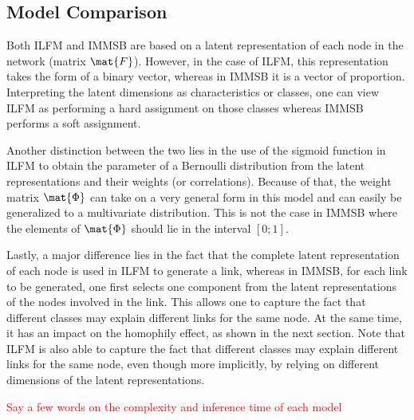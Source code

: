 \subsection{Model Comparison}

Both ILFM and IMMSB are based on a latent representation of each node in the network (matrix $\mat{F}$). However, in the case of ILFM, this representation takes the form of a binary vector, whereas in IMMSB it is a vector of proportion. Interpreting the latent dimensions as characteristics or classes, one can view ILFM as performing a hard assignment on those classes whereas IMMSB performs a soft assignment. 

Another distinction between the two lies in the use of the sigmoid function in ILFM to obtain the parameter of a Bernoulli distribution from the latent representations and their weights (or correlations). Because of that, the weight matrix $\mat{\Phi}$ can take on a very general form in this model and can easily be generalized to a multivariate distribution. This is not the case in IMMSB where the elements of $\mat{\Phi}$ should lie in the interval $[0;1]$. 

Lastly, a major difference lies in the fact that the complete latent representation of each node is used in ILFM to generate a link, whereas in IMMSB, for each link to be generated, one first selects one component from the latent representations of the nodes involved in the link. This allows one to capture the fact that different classes may explain different links for the same node. At the same time, it has an impact on the homophily effect, as shown in the next section. Note that ILFM is also able to capture the fact that different classes may explain different links for the same node, even though more implicitly, by relying on different dimensions of the latent representations.

\textcolor{red}{Say a few words on the complexity and inference time of each model}
